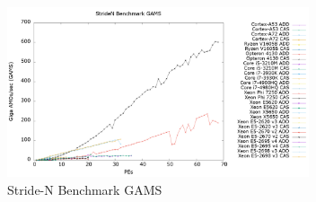 \begin{figure}[!t]
\centering
\includegraphics[width=3.5in]{figures/STRIDEN_GAMS.png}
\caption{Stride-N Benchmark GAMS}
\label{fig:sn_gams}
\end{figure}
